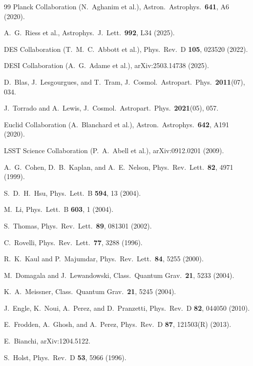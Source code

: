 \documentclass[aps,prd,twocolumn,10pt,superscriptaddress,nofootinbib]{revtex4-2}
\begin{document}
\begin{thebibliography}{99}
Planck Collaboration (N.~Aghanim et al.),
Astron.\ Astrophys.\ \textbf{641}, A6 (2020).

A.~G.~Riess et al.,
Astrophys.\ J.\ Lett.\ \textbf{992}, L34 (2025).

DES Collaboration (T.~M.~C.~Abbott et al.),
Phys.\ Rev.\ D \textbf{105}, 023520 (2022).

DESI Collaboration (A.~G.~Adame et al.),
arXiv:2503.14738 (2025).

D.~Blas, J.~Lesgourgues, and T.~Tram,
J.\ Cosmol.\ Astropart.\ Phys.\ \textbf{2011}(07), 034.

J.~Torrado and A.~Lewis,
J.\ Cosmol.\ Astropart.\ Phys.\ \textbf{2021}(05), 057.

Euclid Collaboration (A.~Blanchard et al.),
Astron.\ Astrophys.\ \textbf{642}, A191 (2020).

LSST Science Collaboration (P.~A.~Abell et al.),
arXiv:0912.0201 (2009).

A.~G.~Cohen, D.~B.~Kaplan, and A.~E.~Nelson,
Phys.\ Rev.\ Lett.\ \textbf{82}, 4971 (1999).

S.~D.~H.~Hsu,
Phys.\ Lett.\ B \textbf{594}, 13 (2004).

M.~Li,
Phys.\ Lett.\ B \textbf{603}, 1 (2004).

S.~Thomas,
Phys.\ Rev.\ Lett.\ \textbf{89}, 081301 (2002).


C.~Rovelli,
Phys.\ Rev.\ Lett.\ \textbf{77}, 3288 (1996).

R.~K.~Kaul and P.~Majumdar,
Phys.\ Rev.\ Lett.\ \textbf{84}, 5255 (2000).

M.~Domagala and J.~Lewandowski,
Class.\ Quantum Grav.\ \textbf{21}, 5233 (2004).

K.~A.~Meissner,
Class.\ Quantum Grav.\ \textbf{21}, 5245 (2004).

J.~Engle, K.~Noui, A.~Perez, and D.~Pranzetti,
Phys.\ Rev.\ D \textbf{82}, 044050 (2010).

E.~Frodden, A.~Ghosh, and A.~Perez,
Phys.\ Rev.\ D \textbf{87}, 121503(R) (2013).

E.~Bianchi,
arXiv:1204.5122.

S.~Holst,
Phys.\ Rev.\ D \textbf{53}, 5966 (1996).


\end{thebibliography}
\end{document}
